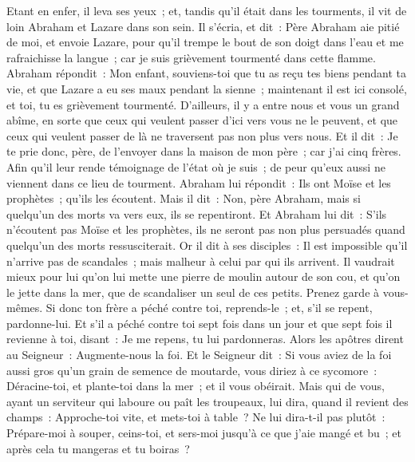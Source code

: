 \begin{multicols}{2}
Etant en enfer, il leva ses yeux~; et, tandis qu'il était dans les tourments, il vit de loin Abraham et Lazare dans son sein.
Il s'écria, et dit~: Père Abraham aie pitié de moi, et envoie Lazare, pour qu'il trempe le bout de son doigt dans l'eau et me rafraichisse la langue~; car je suis grièvement tourmenté dans cette flamme.
Abraham répondit~: Mon enfant, souviens-toi que tu as reçu tes biens pendant ta vie, et que Lazare a eu ses maux pendant la sienne~; maintenant il est ici consolé, et toi, tu es grièvement tourmenté.
D'ailleurs, il y a entre nous et vous un grand abîme, en sorte que ceux qui veulent passer d'ici vers vous ne le peuvent, et que ceux qui veulent passer de là ne traversent pas non plus vers nous.
Et il dit~: Je te prie donc, père, de l'envoyer dans la maison de mon père~; car j'ai cinq frères.
Afin qu'il leur rende témoignage de l'état où je suis~; de peur qu'eux aussi ne viennent dans ce lieu de tourment.
Abraham lui répondit~: Ils ont Moïse et les prophètes~; qu'ils les écoutent.
Mais il dit~: Non, père Abraham, mais si quelqu'un des morts va vers eux, ils se repentiront.
Et Abraham lui dit~: S'ils n'écoutent pas Moïse et les prophètes, ils ne seront pas non plus persuadés quand quelqu'un des morts ressusciterait.
\VerseOne{}Or il dit à ses disciples~: Il est impossible qu'il n'arrive pas de scandales~; mais malheur à celui par qui ils arrivent.
Il vaudrait mieux pour lui qu'on lui mette une pierre de moulin autour de son cou, et qu'on le jette dans la mer, que de scandaliser un seul de ces petits.
Prenez garde à vous-mêmes. Si donc ton frère a péché contre toi, reprends-le~; et, s'il se repent, pardonne-lui.
Et s'il a péché contre toi sept fois dans un jour et que sept fois il revienne à toi, disant~: Je me repens, tu lui pardonneras.
Alors les apôtres dirent au Seigneur~: Augmente-nous la foi.
Et le Seigneur dit~: Si vous aviez de la foi aussi gros qu'un grain de semence de moutarde, vous diriez à ce sycomore~: Déracine-toi, et plante-toi dans la mer~; et il vous obéirait.
Mais qui de vous, ayant un serviteur qui laboure ou paît les troupeaux, lui dira, quand il revient des champs~: Approche-toi vite, et mets-toi à table~?
Ne lui dira-t-il pas plutôt~: Prépare-moi à souper, ceins-toi, et sers-moi jusqu'à ce que j'aie mangé et bu~; et après cela tu mangeras et tu boiras~?

\end{multicols}
